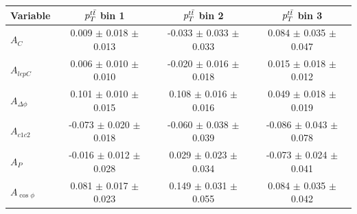 \begin{table}[hbt]
\begin{center}
\begin{tabular}{l |  c  c  c }
\hline
Variable & $p_T^{t\bar{t}}$ bin 1 & $p_T^{t\bar{t}}$ bin 2 & $p_T^{t\bar{t}}$ bin 3  \\ \hline
$A_{C}$                                 &       0.009   $\pm$   0.018   $\pm$   0.013   &       -0.033  $\pm$   0.033   $\pm$   0.033   &       0.084   $\pm$   0.035   $\pm$   0.047   \\
$A_{lepC}$                              &       0.006   $\pm$   0.010   $\pm$   0.010   &       -0.020  $\pm$   0.016   $\pm$   0.018   &       0.015   $\pm$   0.018   $\pm$   0.012   \\
$A_{\Delta\phi}$                &       0.101   $\pm$   0.010   $\pm$   0.015   &       0.108   $\pm$   0.016   $\pm$   0.016   &       0.049   $\pm$   0.018   $\pm$   0.019   \\
$A_{c1c2}$                              &       -0.073  $\pm$   0.020   $\pm$   0.018   &       -0.060  $\pm$   0.038   $\pm$   0.039   &       -0.086  $\pm$   0.043   $\pm$   0.078   \\
$A_{P}$                   &       -0.016  $\pm$   0.012   $\pm$   0.028   &       0.029   $\pm$   0.023   $\pm$   0.034   &       -0.073  $\pm$   0.024   $\pm$   0.041   \\
$A_{\cos\phi}$                              &       0.081   $\pm$   0.017   $\pm$   0.023   &       0.149   $\pm$   0.031   $\pm$   0.055   &       0.084   $\pm$   0.035   $\pm$   0.042   \\
 \hline
\end{tabular}
\end{center}
\end{table}





